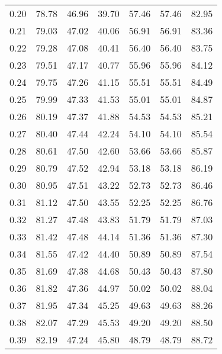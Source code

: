 \begin{tabular}{|c|c|c|c|c|c|c|}
      0.20 &     78.78 &     46.96 &      39.70 &   57.46 &      57.46 &         82.95 \\
      0.21 &     79.03 &     47.02 &      40.06 &   56.91 &      56.91 &         83.36 \\
      0.22 &     79.28 &     47.08 &      40.41 &   56.40 &      56.40 &         83.75 \\
      0.23 &     79.51 &     47.17 &      40.77 &   55.96 &      55.96 &         84.12 \\
      0.24 &     79.75 &     47.26 &      41.15 &   55.51 &      55.51 &         84.49 \\
      0.25 &     79.99 &     47.33 &      41.53 &   55.01 &      55.01 &         84.87 \\
      0.26 &     80.19 &     47.37 &      41.88 &   54.53 &      54.53 &         85.21 \\
      0.27 &     80.40 &     47.44 &      42.24 &   54.10 &      54.10 &         85.54 \\
      0.28 &     80.61 &     47.50 &      42.60 &   53.66 &      53.66 &         85.87 \\
      0.29 &     80.79 &     47.52 &      42.94 &   53.18 &      53.18 &         86.19 \\
      0.30 &     80.95 &     47.51 &      43.22 &   52.73 &      52.73 &         86.46 \\
      0.31 &     81.12 &     47.50 &      43.55 &   52.25 &      52.25 &         86.76 \\
      0.32 &     81.27 &     47.48 &      43.83 &   51.79 &      51.79 &         87.03 \\
      0.33 &     81.42 &     47.48 &      44.14 &   51.36 &      51.36 &         87.30 \\
      0.34 &     81.55 &     47.42 &      44.40 &   50.89 &      50.89 &         87.54 \\
      0.35 &     81.69 &     47.38 &      44.68 &   50.43 &      50.43 &         87.80 \\
      0.36 &     81.82 &     47.36 &      44.97 &   50.02 &      50.02 &         88.04 \\
      0.37 &     81.95 &     47.34 &      45.25 &   49.63 &      49.63 &         88.26 \\
      0.38 &     82.07 &     47.29 &      45.53 &   49.20 &      49.20 &         88.50 \\
      0.39 &     82.19 &     47.24 &      45.80 &   48.79 &      48.79 &         88.72 \\

\end{tabular}
